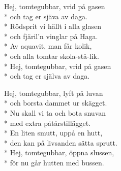 \begin{SongText}
    \begin{SongVerse}
        Hej, tomtegubbar, vrid på gasen\\*%
        och tag er sjäva av daga.\\*%
        Rödsprit vi hällt i alla glasen\\*%
        och fjäril’n vinglar på Haga.\\*%
        Av aquavit, man får kolik,\\*%
        och alla tomtar skola-stå-lik.\\*%
        Hej, tomtegubbar, vrid på gasen\\*%
        och tag er själva av daga.
    \end{SongVerse}
\end{SongText}
\begin{SongText}
    \begin{SongVerse}
        Hej, tomtegubbar, lyft på luvan\\*%
        och borsta dammet ur skägget.\\*%
        Nu skall vi ta och bota snuvan\\*%
        med extra påtårstillägget.\\*%
        En liten smutt, uppå en hutt,\\*%
        den kan på livsanden sätta sprutt.\\*%
        Hej, tomtegubbar, öppna slussen,\\*%
        för nu går hutten med bussen.
    \end{SongVerse}
\end{SongText}
